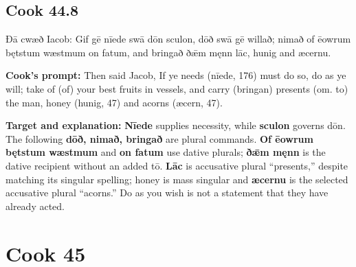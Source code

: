 \par\begin{minipage}{\linewidth}\raggedright
\subsection*{Cook 44.8}

Ðā cwæð Iacob: Gif gē nīede swā dōn sculon, dōð swā gē willað; nimað of ēowrum bętstum wæstmum on fatum, and bringað ðǣm męnn lāc, hunig and æcernu.

\textbf{Cook’s prompt:} Then said Jacob, If ye needs (nīede, 176) must do so, do as ye will; take of (of) your best fruits in vessels, and carry (bringan) presents (om. to) the man, honey (hunig, 47) and acorns (æcern, 47).

\textbf{Target and explanation:} \textbf{Nīede} supplies necessity, while \textbf{sculon} governs dōn. The following \textbf{dōð, nimað, bringað} are plural commands. \textbf{Of ēowrum bętstum wæstmum} and \textbf{on fatum} use dative plurals; \textbf{ðǣm męnn} is the dative recipient without an added tō. \textbf{Lāc} is accusative plural “presents,” despite matching its singular spelling; honey is mass singular and \textbf{æcernu} is the selected accusative plural “acorns.” Do as you wish is not a statement that they have already acted.

\end{minipage}\par\addvspace{4pt}

\clearpage
\section*{Cook 45}

